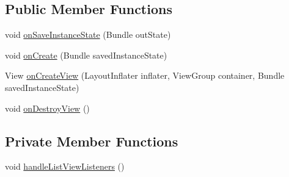 \subsection*{Public Member Functions}
\begin{DoxyCompactItemize}
\item 
void \hyperlink{classorg_1_1buildmlearn_1_1matchtemplate_1_1fragment_1_1DetailActivityFragment_a86e92338ca79f88ea70edec8335ec4cf}{on\+Save\+Instance\+State} (Bundle out\+State)
\item 
void \hyperlink{classorg_1_1buildmlearn_1_1matchtemplate_1_1fragment_1_1DetailActivityFragment_abef5643ae99d067b0da800ab8048cabe}{on\+Create} (Bundle saved\+Instance\+State)
\item 
View \hyperlink{classorg_1_1buildmlearn_1_1matchtemplate_1_1fragment_1_1DetailActivityFragment_a1a3522363835517f7f61902ec1afa6dc}{on\+Create\+View} (Layout\+Inflater inflater, View\+Group container, Bundle saved\+Instance\+State)
\item 
void \hyperlink{classorg_1_1buildmlearn_1_1matchtemplate_1_1fragment_1_1DetailActivityFragment_a3f5c71cbe947fa406c5a9d60b2ec7711}{on\+Destroy\+View} ()
\end{DoxyCompactItemize}
\subsection*{Private Member Functions}
\begin{DoxyCompactItemize}
\item 
void \hyperlink{classorg_1_1buildmlearn_1_1matchtemplate_1_1fragment_1_1DetailActivityFragment_a11a8c8c7f0223fdd2e084007acfaeb58}{handle\+List\+View\+Listeners} ()
\end{DoxyCompactItemize}
